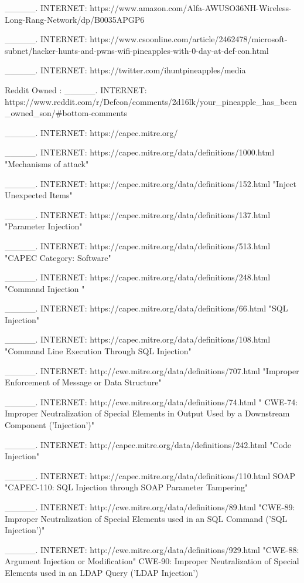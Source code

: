 \_\_\_\_\_. INTERNET: https://www.amazon.com/Alfa-AWUSO36NH-Wireless-Long-Rang-Network/dp/B0035APGP6

\_\_\_\_\_. INTERNET: https://www.csoonline.com/article/2462478/microsoft-subnet/hacker-hunts-and-pwns-wifi-pineapples-with-0-day-at-def-con.html

\_\_\_\_\_. INTERNET: https://twitter.com/ihuntpineapples/media

Reddit Owned : \_\_\_\_\_. INTERNET: https://www.reddit.com/r/Defcon/comments/2d16lk/your\_pineapple\_has\_been\_owned\_son/\#bottom-comments

\_\_\_\_\_. INTERNET: https://capec.mitre.org/

\_\_\_\_\_. INTERNET: https://capec.mitre.org/data/definitions/1000.html "Mechanisms of \gls{attack}"

\_\_\_\_\_. INTERNET: https://capec.mitre.org/data/definitions/152.html "Inject Unexpected Items"

\_\_\_\_\_. INTERNET: https://capec.mitre.org/data/definitions/137.html "Parameter Injection"

\_\_\_\_\_. INTERNET: https://capec.mitre.org/data/definitions/513.html "CAPEC Category: Software"

\_\_\_\_\_. INTERNET: https://capec.mitre.org/data/definitions/248.html "Command Injection "

\_\_\_\_\_. INTERNET: https://capec.mitre.org/data/definitions/66.html "SQL Injection"

\_\_\_\_\_. INTERNET: https://capec.mitre.org/data/definitions/108.html "Command Line Execution Through SQL Injection"

\_\_\_\_\_. INTERNET: http://cwe.mitre.org/data/definitions/707.html "Improper Enforcement of Message or Data Structure"

\_\_\_\_\_. INTERNET: http://cwe.mitre.org/data/definitions/74.html " CWE-74: Improper Neutralization of Special Elements in Output Used by a Downstream Component ('Injection')"

\_\_\_\_\_. INTERNET: http://capec.mitre.org/data/definitions/242.html "Code Injection"

\_\_\_\_\_. INTERNET: https://capec.mitre.org/data/definitions/110.html SOAP "CAPEC-110: SQL Injection through SOAP Parameter Tampering"

\_\_\_\_\_. INTERNET: http://cwe.mitre.org/data/definitions/89.html "CWE-89: Improper Neutralization of Special Elements used in an SQL Command ('SQL Injection')"

\_\_\_\_\_. INTERNET: http://cwe.mitre.org/data/definitions/929.html "CWE-88: Argument Injection or Modification" CWE-90: Improper Neutralization of Special Elements used in an LDAP Query ('LDAP Injection')

